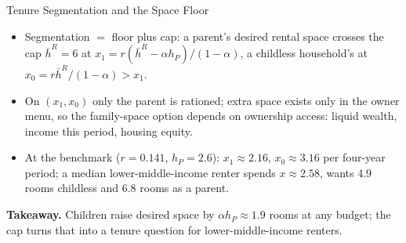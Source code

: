 \documentclass[11pt,aspectratio=169]{beamer}
\newcommand{\1}{\mathbf 1}
\newcommand{\takeaway}[1]{\vfill{\small\textbf{Takeaway.} #1}}
\begin{document}
\begin{frame}[t]{Tenure Segmentation and the Space Floor}
\begin{minipage}[t]{0.535\textwidth}
\end{minipage}\hfill
\begin{minipage}[t]{0.445\textwidth}
\vspace{0pt}
\linespread{1.0}\scriptsize\setlength{\leftmargini}{1em}
\begin{itemize}\setlength{\itemsep}{0.2em}\setlength{\parskip}{0pt}
\item Segmentation $=$ floor plus cap: a parent's desired rental space crosses the cap $\bar h^R = 6$ at $x_1 = r(\bar h^R - \alpha h_P)/(1-\alpha)$, a childless household's at $x_0 = r\bar h^R/(1-\alpha) > x_1$.
\item On $(x_1, x_0)$ only the parent is rationed; extra space exists only in the owner menu, so the family-space option depends on ownership access: liquid wealth, income this period, housing equity.
\item At the benchmark ($r = 0.141$, $h_P = 2.6$): $x_1 \approx 2.16$, $x_0 \approx 3.16$ per four-year period; a median lower-middle-income renter spends $x \approx 2.58$, wants 4.9 rooms childless and 6.8 rooms as a parent.
\end{itemize}
\end{minipage}

\takeaway{Children raise desired space by $\alpha h_P \approx 1.9$ rooms at any budget; the cap turns that into a tenure question for lower-middle-income renters.}
\end{frame}
\end{document}
